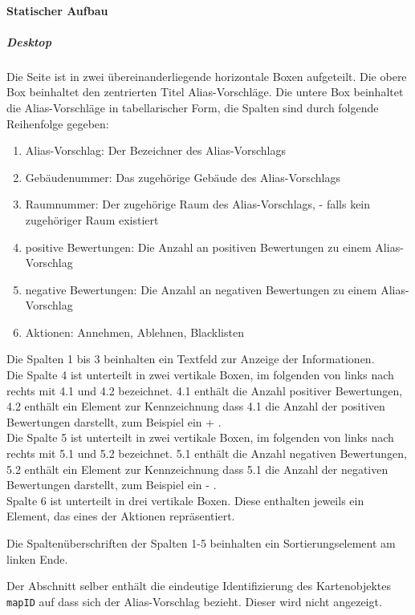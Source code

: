 \paragraph*{Statischer Aufbau}
\subparagraph*{Desktop}
Die Seite ist in zwei übereinanderliegende horizontale Boxen aufgeteilt.
Die obere Box beinhaltet den zentrierten Titel \dq Alias-Vorschläge\dq.
Die untere Box beinhaltet die Alias-Vorschläge in tabellarischer Form, die Spalten sind durch folgende Reihenfolge gegeben:

\begin{enumerate}
    \item Alias-Vorschlag: Der Bezeichner des Alias-Vorschlags
    \item Gebäudenummer: Das zugehörige Gebäude des Alias-Vorschlags
    \item Raumnummer: Der zugehörige Raum des Alias-Vorschlags, \dq - \dq{} falls kein zugehöriger Raum existiert
    \item positive Bewertungen: Die Anzahl an positiven Bewertungen zu einem Alias-Vorschlag
    \item negative Bewertungen: Die Anzahl an negativen Bewertungen zu einem Alias-Vorschlag
    \item Aktionen: Annehmen, Ablehnen, Blacklisten
\end{enumerate}

Die Spalten 1 bis 3 beinhalten ein Textfeld zur Anzeige der Informationen. \\
Die Spalte 4 ist unterteilt in zwei vertikale Boxen, im folgenden von links nach rechts mit 4.1 und 4.2 bezeichnet.
4.1 enthält die Anzahl positiver Bewertungen, 4.2 enthält ein Element zur Kennzeichnung dass 4.1 die Anzahl der positiven Bewertungen darstellt, zum Beispiel ein \dq + \dq. \\
Die Spalte 5 ist unterteilt in zwei vertikale Boxen, im folgenden von links nach rechts mit 5.1 und 5.2 bezeichnet.
5.1 enthält die Anzahl negativen Bewertungen, 5.2 enthält ein Element zur Kennzeichnung dass 5.1 die Anzahl der negativen Bewertungen darstellt, zum Beispiel ein \dq - \dq. \\
Spalte 6 ist unterteilt in drei vertikale Boxen. Diese enthalten jeweils ein Element, das eines der Aktionen repräsentiert. 

Die Spaltenüberschriften der Spalten 1-5 beinhalten ein Sortierungselement am linken Ende.

Der Abschnitt selber enthält die eindeutige Identifizierung des Kartenobjektes \verb#mapID# auf dass sich der Alias-Vorschlag bezieht. Dieser wird nicht angezeigt.

